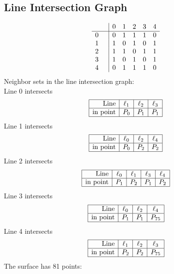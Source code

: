 \documentclass{article}
\begin{document}
{\subsection*{Line Intersection Graph}
{\arraycolsep=1pt
$$
\begin{array}{rr|*{5}r}
 &  & 0 & 1 & 2 & 3 & 4\\
\hline
0 &  & 0 & 1 & 1 & 1 & 0\\
1 &  & 1 & 0 & 1 & 0 & 1\\
2 &  & 1 & 1 & 0 & 1 & 1\\
3 &  & 1 & 0 & 1 & 0 & 1\\
4 &  & 0 & 1 & 1 & 1 & 0\\
\end{array}
$$
}%
Neighbor sets in the line intersection graph:\\
Line 0 intersects 
$$
\begin{array}{|r*{3}{|c}|}
\hline
\mbox{Line}  & \ell_{1} & \ell_{2} & \ell_{3}\\
\hline
\mbox{in point}  & P_{0} & P_{1} & P_{1}\\
\hline
\end{array}
$$
Line 1 intersects 
$$
\begin{array}{|r*{3}{|c}|}
\hline
\mbox{Line}  & \ell_{0} & \ell_{2} & \ell_{4}\\
\hline
\mbox{in point}  & P_{0} & P_{2} & P_{2}\\
\hline
\end{array}
$$
Line 2 intersects 
$$
\begin{array}{|r*{4}{|c}|}
\hline
\mbox{Line}  & \ell_{0} & \ell_{1} & \ell_{3} & \ell_{4}\\
\hline
\mbox{in point}  & P_{1} & P_{2} & P_{1} & P_{2}\\
\hline
\end{array}
$$
Line 3 intersects 
$$
\begin{array}{|r*{3}{|c}|}
\hline
\mbox{Line}  & \ell_{0} & \ell_{2} & \ell_{4}\\
\hline
\mbox{in point}  & P_{1} & P_{1} & P_{75}\\
\hline
\end{array}
$$
Line 4 intersects 
$$
\begin{array}{|r*{3}{|c}|}
\hline
\mbox{Line}  & \ell_{1} & \ell_{2} & \ell_{3}\\
\hline
\mbox{in point}  & P_{2} & P_{2} & P_{75}\\
\hline
\end{array}
$$
The surface has 81 points:\\
}
\end{document}
